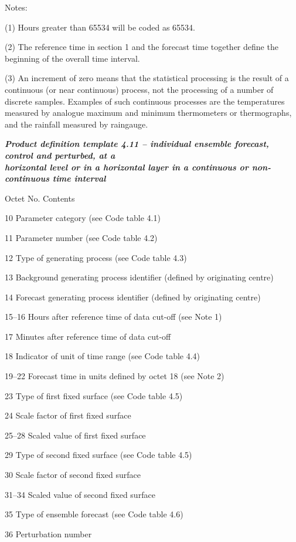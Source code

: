 Notes:

(1) Hours greater than 65534 will be coded as 65534.

(2) The reference time in section 1 and the forecast time together define the beginning of the overall time interval.

(3) An increment of zero means that the statistical processing is the result of a continuous (or near continuous) process, not the processing of a number of discrete samples. Examples of such continuous processes are the temperatures measured by analogue maximum and minimum thermometers or thermographs, and the rainfall measured by raingauge.

\emph{\textbf{Product definition template 4.11 -- individual ensemble forecast, control and perturbed, at a\\
horizontal level or in a horizontal layer in a continuous or non-\\
continuous time interval}}

Octet No. Contents

10 Parameter category (see Code table 4.1)

11 Parameter number (see Code table 4.2)

12 Type of generating process (see Code table 4.3)

13 Background generating process identifier (defined by originating centre)

14 Forecast generating process identifier (defined by originating centre)

15--16 Hours after reference time of data cut-off (see Note 1)

17 Minutes after reference time of data cut-off

18 Indicator of unit of time range (see Code table 4.4)

19--22 Forecast time in units defined by octet 18 (see Note 2)

23 Type of first fixed surface (see Code table 4.5)

24 Scale factor of first fixed surface

25--28 Scaled value of first fixed surface

29 Type of second fixed surface (see Code table 4.5)

30 Scale factor of second fixed surface

31--34 Scaled value of second fixed surface

35 Type of ensemble forecast (see Code table 4.6)

36 Perturbation number

